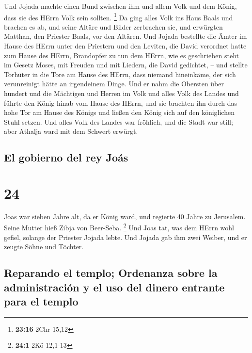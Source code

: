  Und Jojada machte einen Bund zwischen ihm und allem Volk
und dem König, dass sie des HErrn Volk sein sollten. \footnote{\textbf{23:16}
  2Chr 15,12}  Da ging alles Volk ins Haus Baals und
brachen es ab, und seine Altäre und Bilder zerbrachen sie, und erwürgten
Matthan, den Priester Baals, vor den Altären.  Und Jojada
bestellte die Ämter im Hause des HErrn unter den Priestern und den
Leviten, die David verordnet hatte zum Hause des HErrn, Brandopfer zu
tun dem HErrn, wie es geschrieben steht im Gesetz Moses, mit Freuden und
mit Liedern, die David gedichtet, --  und stellte
Torhüter in die Tore am Hause des HErrn, dass niemand hineinkäme, der
sich verunreinigt hätte an irgendeinem Dinge.  Und er
nahm die Obersten über hundert und die Mächtigen und Herren im Volk und
alles Volk des Landes und führte den König hinab vom Hause des HErrn,
und sie brachten ihn durch das hohe Tor am Hause des Königs und ließen
den König sich auf den königlichen Stuhl setzen.  Und
alles Volk des Landes war fröhlich, und die Stadt war still; aber
Athalja ward mit dem Schwert erwürgt.

\hypertarget{el-gobierno-del-rey-jouxe1s}{%
\subsection{El gobierno del rey
Joás}\label{el-gobierno-del-rey-jouxe1s}}

\hypertarget{section-23}{%
\section{24}\label{section-23}}

 Joas war sieben Jahre alt, da er König ward, und regierte
40 Jahre zu Jerusalem. Seine Mutter hieß Zibja von Beer-Seba.
\footnote{\textbf{24:1} 2Kö 12,1-13}  Und Joas tat, was
dem HErrn wohl gefiel, solange der Priester Jojada lebte. 
Und Jojada gab ihm zwei Weiber, und er zeugte Söhne und Töchter.

\hypertarget{reparando-el-templo-ordenanza-sobre-la-administraciuxf3n-y-el-uso-del-dinero-entrante-para-el-templo}{%
\subsection{Reparando el templo; Ordenanza sobre la administración y el
uso del dinero entrante para el
templo}\label{reparando-el-templo-ordenanza-sobre-la-administraciuxf3n-y-el-uso-del-dinero-entrante-para-el-templo}}

